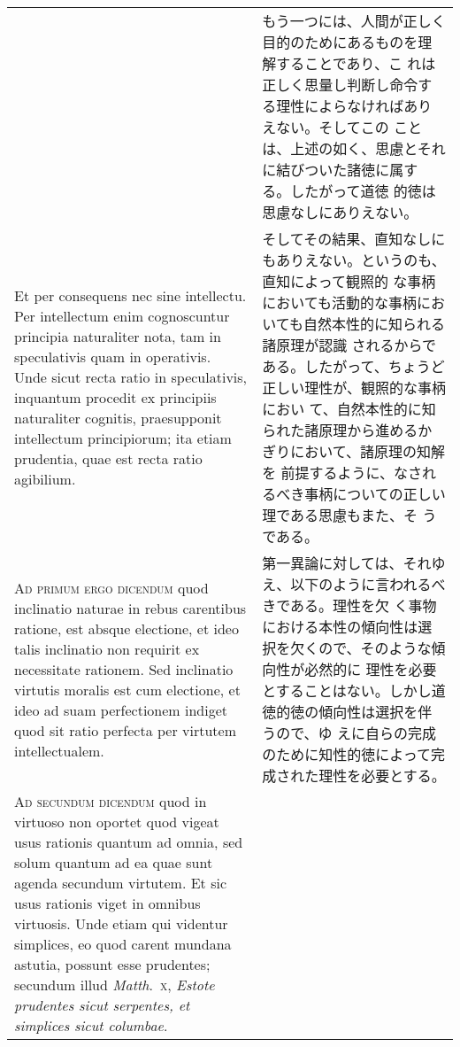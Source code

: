 \documentclass[10pt]{jsarticle}
\begin{document}
\begin{longtable}{p{21em}p{21em}}
&

もう一つには、人間が正しく目的のためにあるものを理解することであり、こ
れは正しく思量し判断し命令する理性によらなければありえない。そしてこの
ことは、上述の如く、思慮とそれに結びついた諸徳に属する。したがって道徳
的徳は思慮なしにありえない。

\\

Et per consequens nec sine intellectu. Per intellectum enim
cognoscuntur principia naturaliter nota, tam in speculativis quam in
operativis. Unde sicut recta ratio in speculativis, inquantum procedit
ex principiis naturaliter cognitis, praesupponit intellectum
principiorum; ita etiam prudentia, quae est recta ratio agibilium.

&

そしてその結果、直知なしにもありえない。というのも、直知によって観照的
な事柄においても活動的な事柄においても自然本性的に知られる諸原理が認識
されるからである。したがって、ちょうど正しい理性が、観照的な事柄におい
て、自然本性的に知られた諸原理から進めるかぎりにおいて、諸原理の知解を
前提するように、なされるべき事柄についての正しい理である思慮もまた、そ
うである。

\\



{\scshape Ad primum ergo dicendum} quod inclinatio naturae in rebus
carentibus ratione, est absque electione, et ideo talis inclinatio non
requirit ex necessitate rationem. Sed inclinatio virtutis moralis est
cum electione, et ideo ad suam perfectionem indiget quod sit ratio
perfecta per virtutem intellectualem.

&

第一異論に対しては、それゆえ、以下のように言われるべきである。理性を欠
く事物における本性の傾向性は選択を欠くので、そのような傾向性が必然的に
理性を必要とすることはない。しかし道徳的徳の傾向性は選択を伴うので、ゆ
えに自らの完成のために知性的徳によって完成された理性を必要とする。

\\



{\scshape Ad secundum dicendum} quod in virtuoso non oportet quod
vigeat usus rationis quantum ad omnia, sed solum quantum ad ea quae
sunt agenda secundum virtutem. Et sic usus rationis viget in omnibus
virtuosis. Unde etiam qui videntur simplices, eo quod carent mundana
astutia, possunt esse prudentes; secundum illud {\itshape
Matth}.~{\scshape x}, {\itshape Estote prudentes sicut serpentes, et
simplices sicut columbae}.


\end{longtable}
\end{document}
